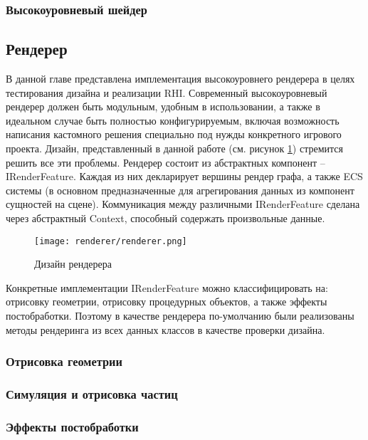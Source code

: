 \subsubsection{Высокоуровневый шейдер}

\subsection{Рендерер}
В данной главе представлена имплементация высокоуровнего рендерера в целях тестирования дизайна и реализации RHI. Современный высокоуровневый рендерер должен быть модульным, удобным в использовании, а также в идеальном случае быть полностью конфигурируемым, включая возможность написания кастомного решения специально под нужды конкретного игрового проекта. Дизайн, представленный в данной работе (см. рисунок \ref{fig:renderer_design}) стремится решить все эти проблемы. Рендерер состоит из абстрактных компонент -- IRenderFeature. Каждая из них декларирует вершины рендер графа, а также ECS системы (в основном предназначенные для агрегирования данных из компонент сущностей на сцене). Коммуникация между различными IRenderFeature сделана через абстрактный Context, способный содержать произвольные данные.

\begin{figure}
    \centering
    \texttt{[image: renderer/renderer.png]}
    \caption{Дизайн рендерера}
    \label{fig:renderer_design}
\end{figure}

Конкретные имплементации IRenderFeature можно классифицировать на: отрисовку геометрии, отрисовку процедурных объектов, а также эффекты постобработки. Поэтому в качестве рендерера по-умолчанию были реализованы методы рендеринга из всех данных классов в качестве проверки дизайна.

\subsubsection{Отрисовка геометрии}


\subsubsection{Симуляция и отрисовка частиц}
\subsubsection{Эффекты постобработки}
